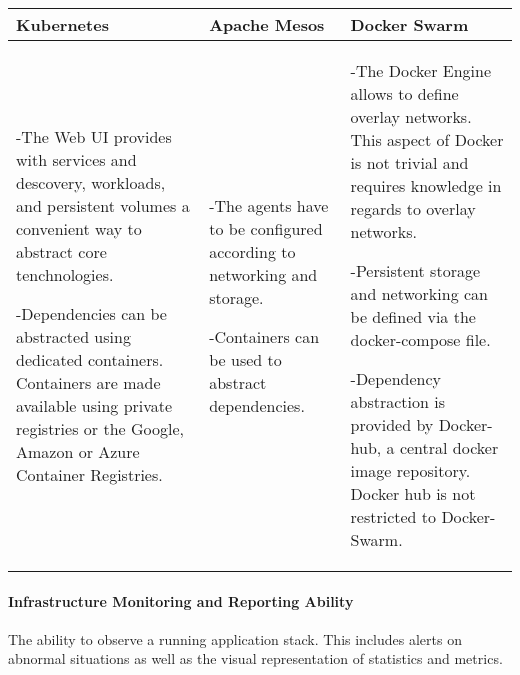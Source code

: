 \begin{center}
  \begin{tabular}{ | p{4.5cm} | p{4.5cm} | p{4.5cm} | }
    \hline
    \textbf{Kubernetes}&\textbf{Apache Mesos}&\textbf{Docker Swarm}\\\hline
    -The Web UI provides with services and descovery, workloads, and persistent
    volumes a convenient way to abstract core tenchnologies.
    
    -Dependencies can be abstracted using dedicated containers. Containers are
    made available using private registries or the Google, Amazon or Azure
    Container Registries.&
    
    -The agents have to be configured according to networking and storage.
    
    -Containers can be used to abstract dependencies. & 
    
    -The Docker Engine allows to define overlay networks. This aspect of
    Docker is not trivial and requires knowledge in regards to overlay
    networks.
    
    -Persistent storage and networking can be defined via the docker-compose
    file.
    
    -Dependency abstraction is provided by Docker-hub, a central docker image
    repository. Docker hub is not restricted to Docker-Swarm.\\
    \hline
  \end{tabular}
\end{center}

\newpage
\paragraph{Infrastructure Monitoring and Reporting Ability}

The ability to observe a running \ms{} application stack. This includes alerts
on abnormal situations as well as the visual representation of statistics and
metrics.

